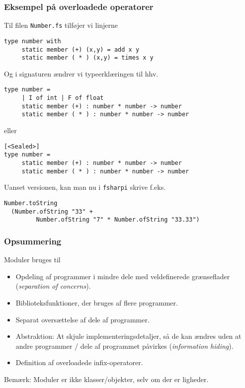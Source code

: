 \documentclass{beamer}
\begin{document}
\begin{frame}[fragile=singleslide]
\frametitle{Eksempel på overloadede operatorer}


Til filen \texttt{Number.fs} tilføjer vi linjerne


\renewcommand{\baselinestretch}{0.75}
{\footnotesize
\begin{verbatim}
type number with
     static member (+) (x,y) = add x y
     static member ( * ) (x,y) = times x y
\end{verbatim}
}

Og i signaturen ændrer vi typeerklæringen til hhv.

\renewcommand{\baselinestretch}{0.75}
{\footnotesize
\begin{verbatim}
type number =
     | I of int | F of float
     static member (+) : number * number -> number
     static member ( * ) : number * number -> number
\end{verbatim}
}

eller

\renewcommand{\baselinestretch}{0.75}
{\footnotesize
\begin{verbatim}
[<Sealed>]
type number =
     static member (+) : number * number -> number
     static member ( * ) : number * number -> number
\end{verbatim}
}

Uanset versionen, kan man nu i \texttt{fsharpi} skrive f.eks.

\renewcommand{\baselinestretch}{0.75}
{\footnotesize
\begin{verbatim}
Number.toString
  (Number.ofString "33" +
         Number.ofString "7" * Number.ofString "33.33")
\end{verbatim}
}

\texttt{\footnotesize }

\end{frame}

\begin{frame}%
\frametitle{Opsummering}

Moduler bruges til

\begin{itemize}
\item Opdeling af programmer i mindre dele med veldefinerede
  grænseflader (\emph{separation of concerns}).
\item Biblioteksfunktioner, der bruges af flere programmer.
\item Separat oversættelse af dele af programmer.
\item Abstraktion: At skjule implementeringsdetaljer, så de kan
  ændres uden at andre programmer / dele af programmet påvirkes
  (\emph{information hiding}).
\item Definition af overloadede infix-operatorer.
\end{itemize}

Bemærk: Moduler er ikke klasser/objekter, selv om der er ligheder.

\end{frame}
\end{document}
